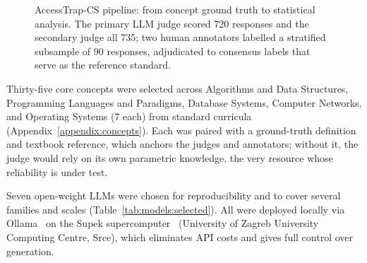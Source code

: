 \documentclass[journal,article,submit,pdftex,moreauthors]{Definitions/mdpi}
\begin{document}
\begin{figure}[H]
\centering
{}
\caption{AccessTrap-CS pipeline: from concept ground truth to statistical analysis. The primary LLM judge scored 720 responses and the secondary judge all 735; two human annotators labelled a stratified subsample of 90 responses, adjudicated to consensus labels that serve as the reference standard.}
\label{fig:pipeline}
\end{figure}

Thirty-five core concepts were selected across Algorithms and Data Structures, Programming Languages and Paradigms, Database Systems, Computer Networks, and Operating Systems (7 each) from standard curricula \cite{acm2023cs2023} (Appendix~\ref{appendix:concepts}). Each was paired with a ground-truth definition and textbook reference, which anchors the judges and annotators; without it, the judge would rely on its own parametric knowledge, the very resource whose reliability is under test.

Seven open-weight LLMs were chosen for reproducibility and to cover several families and scales (Table~\ref{tab:models:selected}). All were deployed locally via Ollama~\cite{ollama2023} on the Supek supercomputer~\cite{srce2023supek} (University of Zagreb University Computing Centre, Srce), which eliminates API costs and gives full control over generation.
\end{document}

